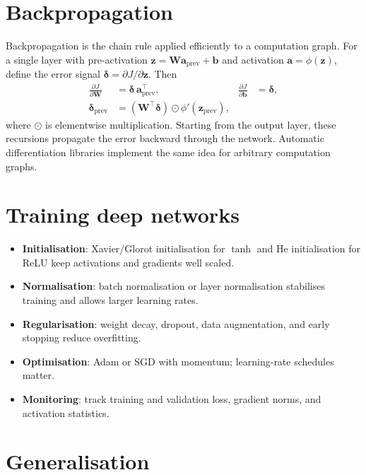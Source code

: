 \documentclass[a4paper, 12pt]{book}
\begin{document}
\section{Backpropagation}

Backpropagation is the chain rule applied efficiently to a computation graph. For a
single layer with pre-activation $\mathbf{z} = \mathbf{W}\mathbf{a}_{\mathrm{prev}}+
\mathbf{b}$ and activation $\mathbf{a}=\phi(\mathbf{z})$, define the error signal
$\boldsymbol{\delta} = \partial J/\partial \mathbf{z}$. Then
\begin{align}
    \frac{\partial J}{\partial \mathbf{W}}
    &= \boldsymbol{\delta}\,\mathbf{a}_{\mathrm{prev}}^\top, &
    \frac{\partial J}{\partial \mathbf{b}} &= \boldsymbol{\delta},\\
    \boldsymbol{\delta}_{\mathrm{prev}}
    &= \left(\mathbf{W}^\top\boldsymbol{\delta}\right)\odot
       \phi'(\mathbf{z}_{\mathrm{prev}}),
\end{align}
where $\odot$ is elementwise multiplication. Starting from the output layer, these
recursions propagate the error backward through the network. Automatic
differentiation libraries implement the same idea for arbitrary computation graphs.

\section{Training deep networks}

\begin{itemize}
    \item \textbf{Initialisation}: Xavier/Glorot initialisation for $\tanh$ and He
    initialisation for ReLU keep activations and gradients well scaled.
    \item \textbf{Normalisation}: batch normalisation or layer normalisation stabilises
    training and allows larger learning rates.
    \item \textbf{Regularisation}: weight decay, dropout, data augmentation, and early
    stopping reduce overfitting.
    \item \textbf{Optimisation}: Adam or SGD with momentum; learning-rate schedules
    matter.
    \item \textbf{Monitoring}: track training and validation loss, gradient norms, and
    activation statistics.
\end{itemize}

\section{Generalisation}
\end{document}
